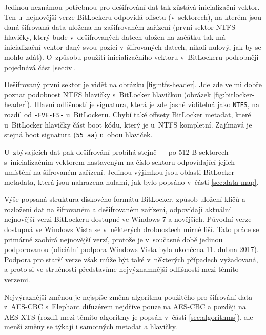 Jedinou neznámou potřebnou pro dešifrování dat tak zůstává inicializační vektor. Ten u~nejnovější verze BitLockeru odpovídá offsetu (v~sektorech), na kterém jsou daná šifrovaná data uložena na zašifrovaném zařízení (první sektor NTFS hlavičky, který bude v~dešifrovaných datech uložen na začátku tak má inicializační vektor daný svou pozicí v~šifrovaných datech, nikoli nulový, jak by se mohlo zdát). O~způsobu použití inicializačního vektoru v~BitLockeru podrobněji pojednává část \ref{sec:iv}.

Dešifrovaný první sektor je vidět na obrázku \ref{fig:ntfs-header}. Jde zde velmi dobře poznat podobnost NTFS hlavičky s~BitLocker hlavičkou (obrázek \ref{fig:bitlocker-header}). Hlavní odlišností je signatura, která je zde jasně viditelná jako \texttt{NTFS}, na rozdíl od \texttt{-FVE-FS-} u~BitLockeru. Chybí také offsety BitLocker metadat, které u~BitLocker hlavičky  část boot kódu, který je u~NTFS kompletní. Zajímavá je stejná boot signatura (\texttt{55 aa}) u~obou hlaviček.

U~zbývajících dat pak dešifrování probíhá stejně --- po 512 B sektorech s~inicializačním vektorem nastaveným na číslo sektoru odpovídající jejich umístění na šifrovaném zařízení. Jedinou výjimkou jsou oblasti BitLocker metadata, která jsou nahrazena nulami, jak bylo popsáno v~části \ref{sec:data-map}.

\label{sec:old-versions}

Výše popsaná struktura diskového formátu BitLocker, způsob uložení klíčů a rozložení dat na šifrovaném a dešifrovaném zařízení, odpovídají aktuální nejnovější verzi BitLockeru dostupné ve Windows 7 a novějších. Původní verze dostupná ve Windows Vista se v~některých drobnostech mírně liší. Tato práce se primárně zaobírá nejnovější verzí, protože je v~současné době jedinou podporovanou (oficiální podpora Windows Vista byla ukončena 11. dubna 2017\cite{hfTs55csrXKY7b4F}). Podpora pro starší verze však může být také v~některých případech vyžadovaná, a proto si ve stručnosti představíme nejvýznamnější odlišnosti mezi těmito verzemi.

Nejvýraznější změnou je nejspíše změna algoritmu použitého pro šifrování data z~AES-CBC s~Elephant difuzérem nejdříve pouze na AES-CBC\cite{Rosendorf2013} a později na AES-XTS\cite{Sosnowski2016} (rozdíl mezi těmito algoritmy je popsán v~části \ref{sec:algorithms}), ale menší změny se týkají i samotných metadat a hlavičky.


